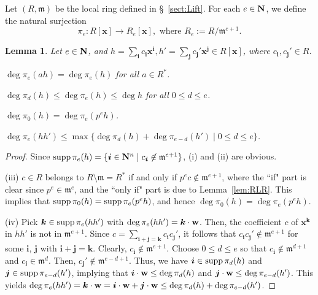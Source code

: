 \documentclass{amsart}
\theoremstyle{plain}
\newtheorem{lem}[thm]{Lemma}
\theoremstyle{definition}
\newcommand{\fm }{{\mathfrak{m}}}
\newcommand{\sm}{\setminus}
\newcommand{\nd}{\noindent}
\newcommand{\N}{{\bf N}}
\newcommand{\x}{{\boldsymbol x}}
\newcommand{\w}{{\bf w}}
\newcommand{\bi}{{\boldsymbol i}}
\newcommand{\bj}{{\boldsymbol j}}
\newcommand{\bk}{{\boldsymbol k}}
\newcommand{\Rx}{R[\x]}
\newcommand{\degw  }{\deg}
\newcommand{\supp }{\mathop{\rm supp}\nolimits}
\begin{document}
Let $(R,\fm )$ be the local ring defined in \S~\ref{sect:Lift}. 
For each $e\in \N $, 
we define the natural surjection 
\begin{equation}\label{eq:pi_e}
\pi _e:\Rx \to R_e[\x ], 
\text{ \ where \ }R_e:=R/\fm ^{e+1}. 
\end{equation}



\begin{lem}\label{lem:reduce coeff}
Let $e\in \N $, 
and 
$h=\sum _{\bi }c_{\bi }\x ^{\bi },
h'=\sum _{\bj }c_{\bj }'\x ^{\bj }\in \Rx $, 
where $c_{\bi },c_{\bj }'\in R$. 


\nd {\rm (i)} 
$\deg \pi _e(ah)=\deg \pi _e(h)$ for all $a\in R^*$. 



\nd {\rm (ii)} 
$\degw \pi _d(h)\le \degw \pi _e(h)\le \degw h$ 
for all $0\le d\le e$. 


\nd {\rm (iii)} 
$\degw \pi _0(h)=\degw \pi _e(p^eh)$. 


\nd {\rm (iv)} 
$\degw \pi _e(hh')
\le \max \{ \degw \pi _{d}(h)+\degw \pi _{e-d}(h')\mid 
0\le d\le e\} $. 
\end{lem}
\begin{proof}
Since 
$\supp \pi _e(h)=\{ \bi \in \N ^n \mid c_{\bi }\not\in \fm ^{e+1}\} $, 
(i) and (ii) are obvious. 



(iii) 
$c\in R$ belongs to $R\sm \fm =R^*$ 
if and only if $p^ec\not\in \fm ^{e+1}$, 
where the ``if" part is clear since $p^e\in \fm ^e$, 
and the ``only if" part is due to Lemma~\ref{lem:RLR}. 
This implies that $\supp \pi _0(h)=\supp \pi _e(p^eh)$, 
and hence $\degw \pi _0(h)=\degw \pi _e(p^eh)$. 



(iv) 
Pick $\bk \in \supp \pi _e(hh')$ 
with $\degw \pi _e(hh')=\bk \cdot \w $. 
Then, 
the coefficient $c$ of $\x ^{\bk }$ in $hh'$ 
is not in $\fm ^{e+1}$. 
Since $c=\sum _{\bi +\bj =\bk }c_{\bi }c_{\bj }'$, 
it follows that 
$c_{\bi }c_{\bj }'\not\in \fm ^{e+1}$ for some 
$\bi $, $\bj $ 
with $\bi +\bj =\bk $. 
Clearly, 
$c_{\bi }\not\in \fm ^{e+1}$. 
Choose $0\le d\le e$ so that 
$c_{\bi }\not\in \fm ^{d+1}$ and $c_{\bi }\in \fm ^d$. 
Then, 
$c_{\bj }'\not\in \fm ^{e-d+1}$. 
Thus, 
we have 
$\bi \in \supp \pi _d(h)$ and $\bj \in \supp \pi _{e-d}(h')$, 
implying that $\bi \cdot \w \le \degw \pi _d(h)$ and 
$\bj \cdot \w \le \degw \pi _{e-d}(h')$. 
This yields 
$\degw \pi _e(hh')=\bk \cdot \w =\bi \cdot \w +\bj \cdot \w 
\le \degw \pi _d(h)+\degw \pi _{e-d}(h')$. 
\end{proof}
\end{document}
